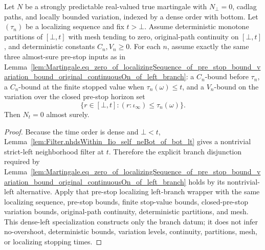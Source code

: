\begin{lemma}\label{lem:Martingale.eq_zero_of_localizingSequence_of_pre_stop_bound_variation_bound_original_continuousOn_of_dense_left}
Let \(N\) be a strongly predictable real-valued true martingale with
\(N_\bot=0\), cadlag paths, and locally bounded variation, indexed by a dense
order with bottom.  Let \((\tau_n)\) be a localizing sequence and fix
\(t>\bot\).  Assume deterministic monotone partitions of \([\bot,t]\) with
mesh tending to zero, original-path continuity on \([\bot,t]\), and
deterministic constants \(C_n,V_n\ge0\).  For each \(n\), assume exactly the
same three almost-sure pre-stop inputs as in
Lemma~\ref{lem:Martingale.eq_zero_of_localizingSequence_of_pre_stop_bound_variation_bound_original_continuousOn_of_left_branch}:
a \(C_n\)-bound before \(\tau_n\), a \(C_n\)-bound at the finite stopped value
when \(\tau_n(\omega)\le t\), and a \(V_n\)-bound on the variation over the
closed pre-stop horizon set
\[
  \{r\in[\bot,t] : (r:\iota_\infty)\le \tau_n(\omega)\}.
\]
Then \(N_t=0\) almost surely.
\end{lemma}

\begin{proof}
Because the time order is dense and \(\bot<t\),
Lemma~\ref{lem:Filter.nhdsWithin_Iio_self_neBot_of_bot_lt} gives a
nontrivial strict-left neighborhood filter at \(t\).  Therefore the explicit
branch disjunction required by
Lemma~\ref{lem:Martingale.eq_zero_of_localizingSequence_of_pre_stop_bound_variation_bound_original_continuousOn_of_left_branch}
holds by its nontrivial-left alternative.  Apply that pre-stop localizing
left-branch wrapper with the same localizing sequence, pre-stop bounds,
finite stop-value bounds, closed-pre-stop variation bounds, original-path
continuity, deterministic partitions, and mesh.  This dense-left
specialization constructs only the branch datum; it does not infer
no-overshoot, deterministic bounds, variation levels, continuity, partitions,
mesh, or localizing stopping times.
\end{proof}

